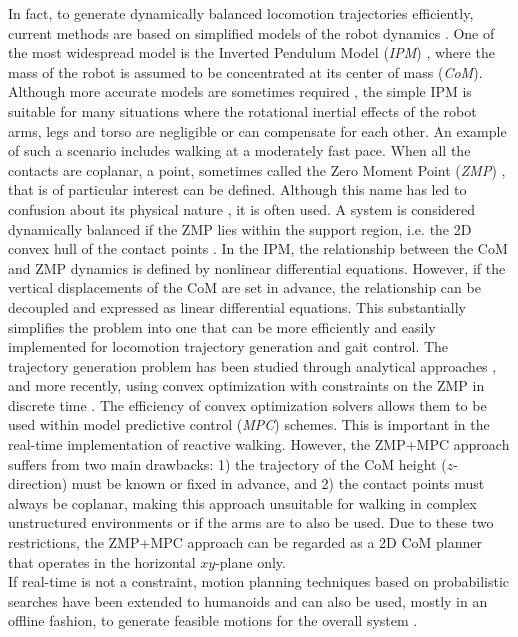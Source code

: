 \documentclass[12pt,a4paper,twoside]{article}
\begin{document}
In fact, to generate dynamically balanced locomotion trajectories efficiently, current methods are based on simplified models of the robot dynamics \cite{SpringerHandb}. One of the most widespread model is the Inverted Pendulum Model (\emph{IPM}) \cite{3Dlinearinve}, where the mass of the robot is assumed to be concentrated at its center of mass (\emph{CoM}). Although more accurate models are sometimes required \cite{RMPmodelfor}, the simple IPM is suitable for many situations where the rotational inertial effects of the robot arms, legs and torso are negligible or can compensate for each other. An example of such a scenario includes walking at a moderately fast pace. When all the contacts are coplanar, a point, sometimes called the Zero Moment Point (\emph{ZMP}) \cite{zmpreview}, that is of particular interest can be defined. Although this name has led to confusion about its physical nature \cite{posturalstabi}, it is often used. A system is considered dynamically balanced if the ZMP lies within the support region, i.e. the 2D convex hull of the contact points \cite{stabilitywalk}. In the IPM, the relationship between the CoM and ZMP dynamics is defined by nonlinear differential equations. However, if the vertical displacements of the CoM are set in advance, the relationship can be decoupled and expressed as linear differential equations. This substantially simplifies the problem into one that can be more efficiently and easily implemented for locomotion trajectory generation and gait control. The trajectory generation problem has been studied through analytical approaches \cite{motionpattern,analyticalgai,walkingallowi}, and more recently, using convex optimization with constraints on the ZMP in discrete time \cite{fastequilibra,walkingpatter,LMPCwalkingw,LMPCforwalki,locomotionvia,walkingwithou}. The efficiency of convex optimization solvers allows them to be used within model predictive control (\emph{MPC}) schemes. This is important in the real-time implementation of reactive walking. However, the ZMP+MPC approach suffers from two main drawbacks: 1) the trajectory of the CoM height ($z$-direction) must be known or fixed in advance, and 2) the contact points must always be coplanar, making this approach unsuitable for walking in complex unstructured environments or if the arms are to also be used. Due to these two restrictions, the ZMP+MPC approach can be regarded as a 2D CoM planner that operates in the horizontal $xy$-plane only.\\

If real-time is not a constraint, motion planning techniques based on probabilistic searches \cite{planningalgor} have been extended to humanoids and can also be used, mostly in an offline fashion, to generate feasible motions for the overall system \cite{hauser2008motion,dalibard2013dynamic,bouyarmane2012humanoid,lengagne2013generation}.\\ %
\end{document}
